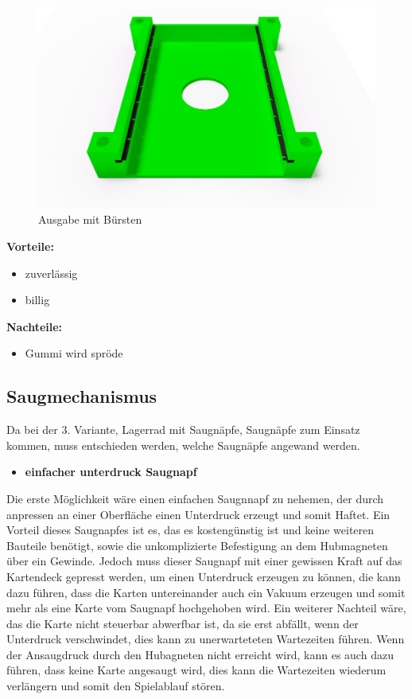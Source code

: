 \begin{figure}[H]
    \centering
    \includegraphics[scale=0.5,page=1]{fig/mech/AusgabeMitGummiabstreifer}
    \caption{Ausgabe mit Bürsten}
\end{figure}

\textbf{Vorteile:}
\begin{itemize}
    \item zuverlässig
    \item billig
\end{itemize}
\textbf{Nachteile:}
\begin{itemize}
    \item Gummi wird spröde
\end{itemize}

\subsection{Saugmechanismus}

Da bei der 3. Variante, Lagerrad mit Saugnäpfe, Saugnäpfe zum Einsatz kommen, muss entschieden werden, welche Saugnäpfe angewand werden.

\begin{itemize}
    \item \textbf{einfacher unterdruck Saugnapf}
\end{itemize}
Die erste Möglichkeit wäre einen einfachen Saugnnapf zu nehemen, der durch anpressen an einer Oberfläche einen Unterdruck erzeugt und somit Haftet. Ein Vorteil dieses Saugnapfes ist es, das es kostengünstig ist und keine weiteren Bauteile benötigt, sowie die
unkomplizierte Befestigung an dem Hubmagneten über ein Gewinde.
Jedoch muss dieser Saugnapf mit einer gewissen Kraft auf das Kartendeck gepresst werden, um einen Unterdruck erzeugen zu können, die kann dazu führen, dass die Karten untereinander auch ein Vakuum erzeugen und somit mehr als eine Karte vom Saugnapf
hochgehoben wird. Ein weiterer Nachteil wäre, das die Karte nicht steuerbar abwerfbar ist, da sie erst abfällt, wenn der Unterdruck verschwindet, dies kann zu unerwarteteten Wartezeiten führen. Wenn der Ansaugdruck durch den Hubagneten nicht erreicht wird, kann
es auch dazu führen, dass keine Karte angesaugt wird, dies kann die Wartezeiten wiederum verlängern und somit den Spielablauf stören.

